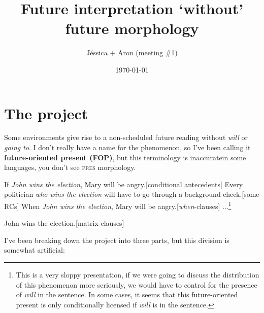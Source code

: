 \documentclass{linghandout}
\title{Future interpretation `without' future morphology}
\author{Jéssica + Aron (meeting \#1)}
\date{\today}
\begin{document}
\maketitle

\section{The project}

Some environments give rise to a non-scheduled future reading without \textit{will} or \textit{going to}. I don't really have a name for the phenomenon, so I've been calling it \textbf{future-oriented present (FOP)}, but this terminology is inaccurate\textemdash in some languages, you don't see \textsc{pres} morphology.

\pex\label{finite} 
\a\label{pred}If \textit{John wins the election}, Mary will be angry.\hfill [conditional antecedents]
\a Every politician \textit{who wins the election} will have to go through a background check.\hfill [some RCs]
\a When \textit{John wins the election}, Mary will be angry.\hfill [\textit{when}-clauses]
\a $\ldots$\footnote{This is a very sloppy presentation, if we were going to discuss the distribution of this phenomenon more seriously, we would have to control for the presence of \textit{will} in the sentence. In some cases, it seems that this future-oriented present is only conditionally licensed if \textit{will} is in the sentence.}
\xe

\ex\ljudge{*}John wins the election.\hfill [matrix clauses]\xe


I've been breaking down the project into three parts, but this division is somewhat artificial:
\end{document}
